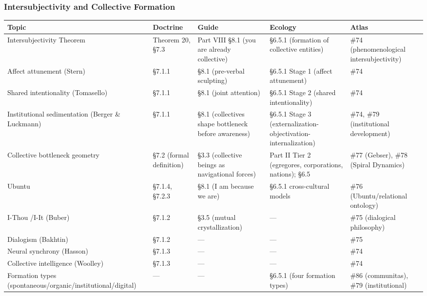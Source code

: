 \subsubsection*{Intersubjectivity and Collective Formation}



{\small
\begin{longtable}{>{\raggedright\arraybackslash}p{} >{\raggedright\arraybackslash}p{} >{\raggedright\arraybackslash}p{} >{\raggedright\arraybackslash}p{} >{\raggedright\arraybackslash}p{}}
\toprule
\textbf{Topic} & \textbf{Doctrine} & \textbf{Guide} & \textbf{Ecology} & \textbf{Atlas} \\
\midrule
\endhead
Intersubjectivity Theorem & Theorem 20, §7.3 & Part VIII §8.1 (you are already collective) & §6.5.1 (formation of collective entities) & \#74 (phenomenological intersubjectivity) \\
Affect attunement (Stern) & §7.1.1 & §8.1 (pre-verbal sculpting) & §6.5.1 Stage 1 (affect attunement) & \#74 \\
Shared intentionality (Tomasello) & §7.1.1 & §8.1 (joint attention) & §6.5.1 Stage 2 (shared intentionality) & \#74 \\
Institutional sedimentation (Berger \& Luckmann) & §7.1.1 & §8.1 (collectives shape bottleneck before awareness) & §6.5.1 Stage 3 (externalization-objectivation-internalization) & \#74, \#79 (institutional development) \\
Collective bottleneck geometry & §7.2 (formal definition) & §3.3 (collective beings as navigational forces) & Part II Tier 2 (egregores, corporations, nations); §6.5 & \#77 (Gebser), \#78 (Spiral Dynamics) \\
Ubuntu & §7.1.4, §7.2.3 & §8.1 (I am because we are) & §6.5.1 cross-cultural models & \#76 (Ubuntu/\allowbreak relational ontology) \\
I-Thou /\allowbreak  I-It (Buber) & §7.1.2 & §3.5 (mutual crystallization) & — & \#75 (dialogical philosophy) \\
Dialogism (Bakhtin) & §7.1.2 & — & — & \#75 \\
Neural synchrony (Hasson) & §7.1.3 & — & — & \#74 \\
Collective intelligence (Woolley) & §7.1.3 & — & — & \#74 \\
Formation types (spontaneous/\allowbreak organic/\allowbreak institutional/\allowbreak digital) & — & — & §6.5.1 (four formation types) & \#86 (communitas), \#79 (institutional) \\
\bottomrule
\end{longtable}
}



